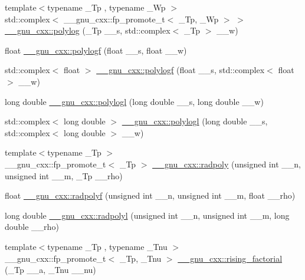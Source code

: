 \begin{DoxyCompactItemize}
\item 
{\footnotesize template$<$typename \+\_\+\+Tp , typename \+\_\+\+Wp $>$ }\\std\+::complex$<$ \+\_\+\+\_\+gnu\+\_\+cxx\+::fp\+\_\+promote\+\_\+t$<$ \+\_\+\+Tp, \+\_\+\+Wp $>$ $>$ \hyperlink{group__gnu__math__spec__func_ga817a208972a0200b667c68d199176d70}{\+\_\+\+\_\+gnu\+\_\+cxx\+::polylog} (\+\_\+\+Tp \+\_\+\+\_\+s, std\+::complex$<$ \+\_\+\+Tp $>$ \+\_\+\+\_\+w)
\item 
float \hyperlink{group__gnu__math__spec__func_ga5bcdd35473144a6d8efc258a79bc82d8}{\+\_\+\+\_\+gnu\+\_\+cxx\+::polylogf} (float \+\_\+\+\_\+s, float \+\_\+\+\_\+w)
\item 
std\+::complex$<$ float $>$ \hyperlink{group__gnu__math__spec__func_ga5376edb72358b777035a78b929deb49f}{\+\_\+\+\_\+gnu\+\_\+cxx\+::polylogf} (float \+\_\+\+\_\+s, std\+::complex$<$ float $>$ \+\_\+\+\_\+w)
\item 
long double \hyperlink{group__gnu__math__spec__func_ga3aa007b4b4e345c30be015ab145d5598}{\+\_\+\+\_\+gnu\+\_\+cxx\+::polylogl} (long double \+\_\+\+\_\+s, long double \+\_\+\+\_\+w)
\item 
std\+::complex$<$ long double $>$ \hyperlink{group__gnu__math__spec__func_ga9eb79e506eda210610bc59c1912b4d0f}{\+\_\+\+\_\+gnu\+\_\+cxx\+::polylogl} (long double \+\_\+\+\_\+s, std\+::complex$<$ long double $>$ \+\_\+\+\_\+w)
\item 
{\footnotesize template$<$typename \+\_\+\+Tp $>$ }\\\+\_\+\+\_\+gnu\+\_\+cxx\+::fp\+\_\+promote\+\_\+t$<$ \+\_\+\+Tp $>$ \hyperlink{group__gnu__math__spec__func_ga195db2592888b7a8df870d9eaeff8d05}{\+\_\+\+\_\+gnu\+\_\+cxx\+::radpoly} (unsigned int \+\_\+\+\_\+n, unsigned int \+\_\+\+\_\+m, \+\_\+\+Tp \+\_\+\+\_\+rho)
\item 
float \hyperlink{group__gnu__math__spec__func_ga8a98d7c7c14f1aadff90123a114fa2c9}{\+\_\+\+\_\+gnu\+\_\+cxx\+::radpolyf} (unsigned int \+\_\+\+\_\+n, unsigned int \+\_\+\+\_\+m, float \+\_\+\+\_\+rho)
\item 
long double \hyperlink{group__gnu__math__spec__func_ga377febebd1096400897170bb7a76cd3a}{\+\_\+\+\_\+gnu\+\_\+cxx\+::radpolyl} (unsigned int \+\_\+\+\_\+n, unsigned int \+\_\+\+\_\+m, long double \+\_\+\+\_\+rho)
\item 
{\footnotesize template$<$typename \+\_\+\+Tp , typename \+\_\+\+Tnu $>$ }\\\+\_\+\+\_\+gnu\+\_\+cxx\+::fp\+\_\+promote\+\_\+t$<$ \+\_\+\+Tp, \+\_\+\+Tnu $>$ \hyperlink{group__gnu__math__spec__func_gae8c36a0e1f60254cf212a3806f7c675c}{\+\_\+\+\_\+gnu\+\_\+cxx\+::rising\+\_\+factorial} (\+\_\+\+Tp \+\_\+\+\_\+a, \+\_\+\+Tnu \+\_\+\+\_\+nu)

\end{DoxyCompactItemize}
